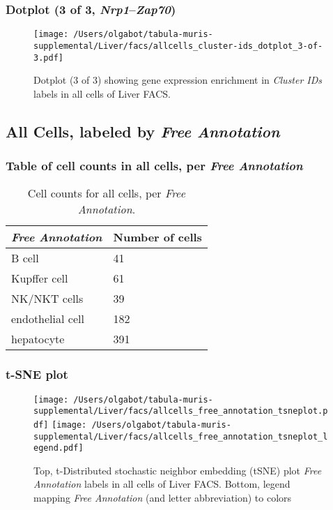 \clearpage

\subsubsection{Dotplot (3 of 3, \emph{Nrp1}--\emph{Zap70})}
\begin{figure}[h]
\centering
\texttt{[image: /Users/olgabot/tabula-muris-supplemental/Liver/facs/allcells\_cluster-ids\_dotplot\_3-of-3.pdf]}

\caption{ Dotplot (3 of 3)  showing gene expression enrichment in \emph{Cluster IDs} labels in all cells of Liver FACS. }
\end{figure}


\clearpage

\subsection{All Cells, labeled by \emph{Free Annotation}}
\subsubsection{Table of cell counts in all cells, per \emph{Free Annotation}}\begin{table}[h]
\centering
\label{my-label}
\begin{tabular}{@{}ll@{}}
\toprule

\emph{Free Annotation}& Number of cells \\ \midrule
B cell & 41 \\

Kupffer cell & 61 \\

NK/NKT cells & 39 \\

endothelial cell & 182 \\

hepatocyte & 391 \\
\bottomrule
\end{tabular}
\caption{Cell counts for all cells, per \emph{Free Annotation}.}
\end{table}

\clearpage
\subsubsection{t-SNE plot}
\begin{figure}[h]
\centering
\texttt{[image: /Users/olgabot/tabula-muris-supplemental/Liver/facs/allcells\_free\_annotation\_tsneplot.pdf]}
\texttt{[image: /Users/olgabot/tabula-muris-supplemental/Liver/facs/allcells\_free\_annotation\_tsneplot\_legend.pdf]}
\caption{Top, t-Distributed stochastic neighbor embedding (tSNE) plot  \emph{Free Annotation} labels in all cells of Liver FACS. Bottom, legend mapping \emph{Free Annotation} (and letter abbreviation) to colors}
\end{figure}


